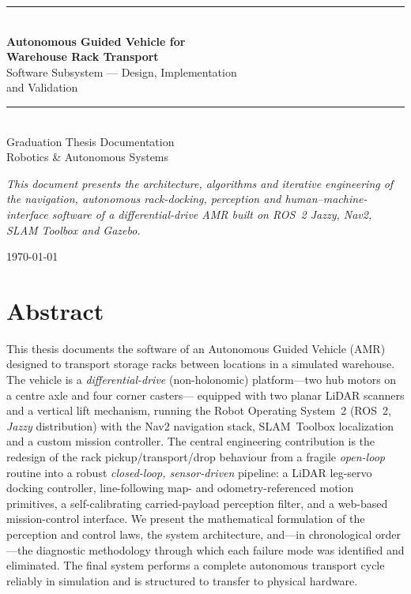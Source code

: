 \documentclass[11pt,a4paper]{article}
\begin{document}
\begin{titlepage}
\centering
\vspace*{2.2cm}
{\color{accent}\rule{\linewidth}{1.4pt}}\\[0.5cm]
{\Huge\bfseries Autonomous Guided Vehicle for\\[0.2cm] Warehouse Rack Transport}\\[0.4cm]
{\LARGE Software Subsystem --- Design, Implementation \\[0.15cm] and Validation}\\[0.3cm]
{\color{accent}\rule{\linewidth}{1.4pt}}\\[1.4cm]
{\large Graduation Thesis Documentation}\\[0.4cm]
{\large Robotics \& Autonomous Systems}\\[2.2cm]
\begin{minipage}{0.85\textwidth}\centering\small
\textit{This document presents the architecture, algorithms and iterative
engineering of the navigation, autonomous rack-docking, perception and
human--machine-interface software of a differential-drive AMR built on ROS~2
Jazzy, Nav2, SLAM Toolbox and Gazebo.}
\end{minipage}
\vfill
{\large \today}
\end{titlepage}

\section*{Abstract}
This thesis documents the software of an Autonomous Guided Vehicle (AMR)
designed to transport storage racks between locations in a simulated
warehouse. The vehicle is a \emph{differential-drive} (non-holonomic)
platform---two hub motors on a centre axle and four corner casters---
equipped with two planar LiDAR scanners and a vertical lift mechanism,
running the Robot Operating System~2 (ROS~2, \emph{Jazzy} distribution) with
the Nav2 navigation stack, SLAM~Toolbox localization and a custom mission
controller. The central engineering contribution is the redesign of the
rack pickup/transport/drop behaviour from a fragile \emph{open-loop} routine
into a robust \emph{closed-loop, sensor-driven} pipeline: a LiDAR leg-servo
docking controller, line-following map- and odometry-referenced motion
primitives, a self-calibrating carried-payload perception filter, and a
web-based mission-control interface. We present the mathematical formulation
of the perception and control laws, the system architecture, and---in
chronological order---the diagnostic methodology through which each failure
mode was identified and eliminated. The final system performs a complete
autonomous transport cycle reliably in simulation and is structured to
transfer to physical hardware.
\end{document}
